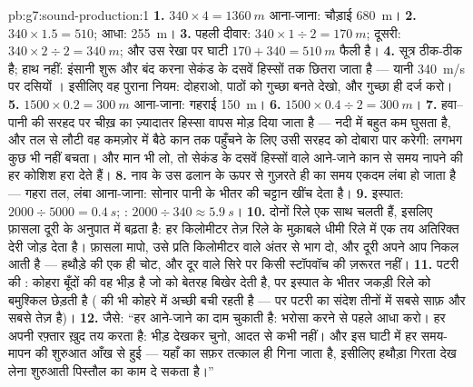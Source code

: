 \begin{solution}{pb:g7:sound-production:1}
\textbf{1.} $340 \times 4 = \qty{1360}{m}$ आना-जाना: चौड़ाई
\qty{680}{m}।
\textbf{2.} $340 \times 1.5 = 510$; आधा: \qty{255}{m}।
\textbf{3.} पहली दीवार: $340 \times 1 \div 2 = \qty{170}{m}$; दूसरी:
$340 \times 2 \div 2 = \qty{340}{m}$; और उस रेखा पर घाटी
$170 + 340 = \qty{510}{m}$ फैली है।
\textbf{4.} सूत्र ठीक-ठीक है; हाथ नहीं: इंसानी शुरू और बंद करना
सेकंड के दसवें हिस्सों तक छितरा जाता है --- यानी \qty{340}{m/s} पर
दसियों । इसीलिए वह पुराना नियम: दोहराओ, पाठों को गुच्छा बनते देखो,
और गुच्छा ही दर्ज करो।
\textbf{5.} $1500 \times 0.2 = \qty{300}{m}$ आना-जाना: गहराई
\qty{150}{m}।
\textbf{6.} $1500 \times 0.4 \div 2 = \qty{300}{m}$।
\textbf{7.} हवा--पानी की सरहद पर चीख़ का ज़्यादातर हिस्सा वापस मोड़
दिया जाता है --- नदी में बहुत कम घुसता है, और तल से लौटी वह कमज़ोर
  में बैठे कान तक पहुँचने के लिए उसी सरहद को दोबारा पार
करेगी: लगभग कुछ भी नहीं बचता। और  मान भी लो, तो सेकंड के
दसवें हिस्सों वाले आने-जाने कान से समय नापने की हर कोशिश हरा देते हैं।
\textbf{8.} नाव के उस ढलान के ऊपर से गुज़रते ही  का समय
एकदम लंबा हो जाता है --- गहरा तल, लंबा आना-जाना: सोनार पानी के भीतर
की चट्टान खींच देता है।
\textbf{9.} इस्पात: $2000 \div 5000 = \qty{0.4}{s}$; : $2000
\div 340 \approx \qty{5.9}{s}$।
\textbf{10.} दोनों रिले एक साथ चलती हैं, इसलिए फ़ासला दूरी के अनुपात
में बढ़ता है: हर किलोमीटर तेज़ रिले के मुक़ाबले धीमी रिले में एक तय
अतिरिक्त देरी जोड़ देता है। फ़ासला मापो, उसे प्रति किलोमीटर वाले
अंतर से भाग दो, और दूरी अपने आप निकल आती है --- हथौड़े की एक ही चोट,
और दूर वाले सिरे पर किसी स्टॉपवॉच की ज़रूरत नहीं।
\textbf{11.} पटरी की : कोहरा बूँदों की वह भीड़ है जो
\emph{} को बेतरह बिखेर देती है, पर  इस्पात के भीतर जकड़ी
रिले को बमुश्किल छेड़ती है ( की  भी कोहरे में अच्छी बची रहती
है --- पर पटरी का संदेश तीनों में सबसे साफ़ और सबसे तेज़ है)।
\textbf{12.} जैसे: ``हर  आने-जाने का दाम चुकाती है: भरोसा
करने से पहले आधा करो। हर  अपनी रफ़्तार ख़ुद तय करता है: 
भीड़ देखकर चुनो, आदत से कभी नहीं। और इस घाटी में हर समय-मापन की
शुरुआत आँख से हुई --- यहाँ  का सफ़र तत्काल ही गिना जाता है,
इसीलिए हथौड़ा गिरता देख लेना शुरुआती पिस्तौल का काम दे सकता है।''
\end{solution}
